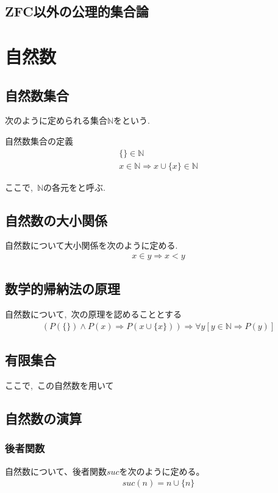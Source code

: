 \documentclass[hyperref,a4paper,12pt]{kininaruki}
\begin{document}
\subsection{ZFC以外の公理的集合論}
\newpage
\section{自然数}
\subsection{自然数集合}
次のように定められる集合$\mathbb{N}$をという.
\begin{itembox}[l]{自然数集合の定義}
\begin{align}
    \{\}\in\mathbb{N}\\
    x\in\mathbb{N}\Rightarrow x\cup\{x\}\in\mathbb{N}
\end{align}
\end{itembox}

ここで,\, $\mathbb{N}$の各元をと呼ぶ.
\subsection{自然数の大小関係}
自然数について大小関係を次のように定める.
\begin{align}
    x\in y\Rightarrow x < y
\end{align}
\subsection{数学的帰納法の原理}
自然数について,\, 次の原理を認めることとする
\begin{align}
    (P(\{\}) \land P(x)\Rightarrow P(x\cup\{x\}))\Rightarrow\forall y [y\in\mathbb{N}\Rightarrow P(y)]
\end{align}
\subsection{有限集合}
ここで,\, この自然数を用いて
\subsection{自然数の演算}
\subsubsection{後者関数}
自然数について、後者関数$suc$を次のように定める。
\begin{align}
    suc(n) = n\cup\{n\}
\end{align}
\end{document}

